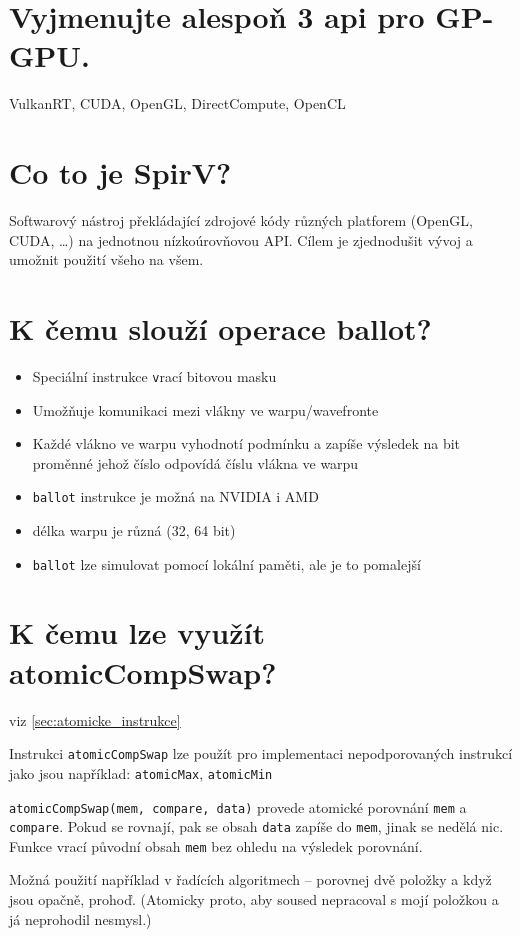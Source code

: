 \section{Vyjmenujte alespoň 3 api pro GP-GPU.}
	VulkanRT, CUDA, OpenGL, DirectCompute, OpenCL


\section{Co to je SpirV?}
	Softwarový nástroj překládající zdrojové kódy různých platforem (OpenGL, CUDA, \dots) na jednotnou nízkoúrovňovou API. Cílem je zjednodušit vývoj a umožnit použití všeho na všem.
	

\section{K čemu slouží operace ballot?}
	\begin{itemize}
		\setlength\itemsep{0em}
		\item Speciální instrukce \texttt vrací bitovou masku
		\item Umožňuje komunikaci mezi vlákny ve warpu/wavefronte
		\item Každé vlákno ve warpu vyhodnotí podmínku a zapíše	výsledek na bit proměnné jehož číslo odpovídá číslu vlákna ve warpu
		\item \texttt{ballot} instrukce je možná na NVIDIA i AMD
		\item délka warpu je různá (32, 64 bit)
		\item \texttt{ballot} lze simulovat pomocí lokální paměti, ale je to pomalejší
	\end{itemize}


\section{K čemu lze využít atomicCompSwap?}
	viz \ref{sec:atomicke_instrukce}
	
	Instrukci \texttt{atomicCompSwap} lze použít pro implementaci nepodporovaných instrukcí jako jsou například: \texttt{atomicMax}, \texttt{atomicMin}
	
	\texttt{atomicCompSwap(mem, compare, data)} provede atomické porovnání \texttt{mem} a \texttt{compare}. Pokud se rovnají, pak se obsah \texttt{data} zapíše do \texttt{mem}, jinak se nedělá nic. Funkce vrací původní obsah \texttt{mem} bez ohledu na výsledek porovnání.
	
	Možná použití například v řadících algoritmech -- porovnej dvě položky a když jsou opačně, prohoď. (Atomicky proto, aby soused nepracoval s mojí položkou a já neprohodil nesmysl.)	


